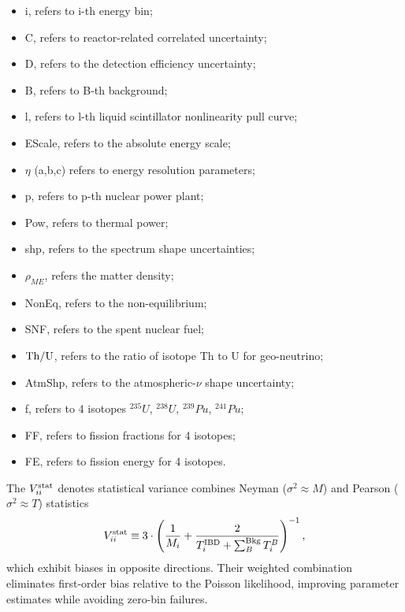 \begin{itemize}
    \item i, refers to i-th energy bin;
    \item C, refers to reactor-related correlated uncertainty;
    \item D, refers to the detection efficiency uncertainty;
    \item B, refers to B-th background;
    \item l, refers to l-th liquid scintillator nonlinearity pull curve;
    \item EScale, refers to the absolute energy scale;
    \item $\eta$ (a,b,c) refers to energy resolution parameters;
    \item p, refers to p-th nuclear power plant;
    \item Pow, refers to thermal power;
    \item shp, refers to the spectrum shape uncertainties;
    \item $\rho_{ME}$, refers the matter density;
    \item NonEq, refers to the non-equilibrium;
    \item SNF, refers to the spent nuclear fuel;
    \item $\rm Th/U$, refers to the ratio of isotope Th to U for geo-neutrino;
    \item AtmShp, refers to the atmospheric-$\nu$ shape uncertainty;
    \item f, refers to 4 isotopes $^{235}U$, $^{238}U$, $^{239}Pu$, $^{241}Pu$;
    \item FF, refers to fission fractions for 4 isotopes;
    \item FE, refers to fission energy for 4 isotopes.
\end{itemize}
The $V_{ii}^{\rm stat}$ denotes statistical variance combines Neyman ($\sigma^2 \approx M$) and Pearson ($\sigma^2 \approx T$) statistics
\begin{equation}
    V_{ii}^{\rm stat}  \equiv 3\cdot\left(\frac{1}{M_i}+\frac{2}{T_i^{\rm IBD}+\sum_B^{\rm Bkg}T_i^{B}}\right)^{-1}\label{eq:Chisq:CNP},
\end{equation}
which exhibit biases in opposite directions. Their weighted combination eliminates first-order bias relative to the Poisson likelihood, improving parameter estimates while avoiding zero-bin failures.

